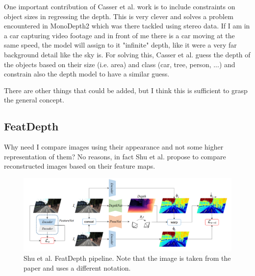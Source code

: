 One important contribution of Casser et al. work is to include constraints on object sizes in regressing the depth.
This is very clever and solves a problem encountered in MonoDepth2 which was there tackled using stereo data.
If I am in a car capturing video footage and in front of me there is a car moving at the same speed, the model will assign to it "infinite" depth, like it were a very far background detail like the sky is.
For solving this, Casser et al. guess the depth of the objects based on their size (i.e. area) and class (car, tree, person, ...) and constrain also the depth model to have a similar guess.

There are other things that could be added, but I think this is sufficient to grasp the general concept.

\subsection{FeatDepth}
Why need I compare images using their appearance and not some higher representation of them?
No reasons, in fact Shu et al. \cite{FeatDepth} propose to compare reconstructed images based on their feature maps.

\begin{figure}
	\centering
	\includegraphics[scale=0.3]{figs/featdepth}
	\caption{Shu et al. FeatDepth \cite{FeatDepth} pipeline. Note that the image is taken from the paper and uses a different notation. \label{fig:featdepth}}
\end{figure}

